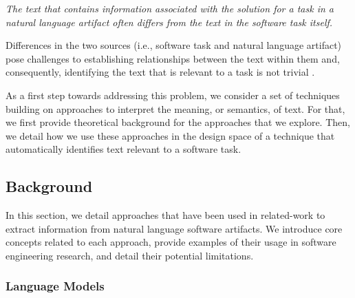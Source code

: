 \medskip
\begin{bluequote}
    \textit{The text  that contains information associated with the solution for a task in a natural language artifact often differs from the text in the software task itself.}
\end{bluequote}


Differences in the two sources (i.e., software task and natural language artifact) pose challenges to establishing relationships between the text within them and, consequently, identifying the text that is relevant to a task is not  trivial .


As a first step towards addressing this problem, we consider a set of techniques
 building on approaches to interpret the meaning, or semantics, of text.
 For that, we first provide theoretical background for the approaches that we explore. Then, we detail how we use these approaches in the design space of a technique that automatically identifies text relevant to a software task.




\subsection{Background}
\label{cp5:background}









In this section, we detail approaches that have been used in related-work to extract information from natural language software artifacts. We introduce core concepts related to each approach, provide examples of their usage in software engineering research, and detail their potential limitations.








\subsubsection{Language Models}














